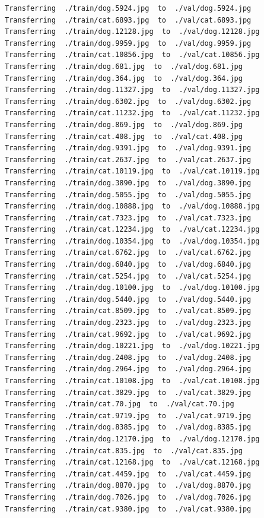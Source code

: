 \documentclass[]{book}
\theoremstyle{definition}
\theoremstyle{definition}
\theoremstyle{definition}
\theoremstyle{remark}
\begin{document}
\begin{verbatim}
Transferring  ./train/dog.5924.jpg  to  ./val/dog.5924.jpg
Transferring  ./train/cat.6893.jpg  to  ./val/cat.6893.jpg
Transferring  ./train/dog.12128.jpg  to  ./val/dog.12128.jpg
Transferring  ./train/dog.9959.jpg  to  ./val/dog.9959.jpg
Transferring  ./train/cat.10856.jpg  to  ./val/cat.10856.jpg
Transferring  ./train/dog.681.jpg  to  ./val/dog.681.jpg
Transferring  ./train/dog.364.jpg  to  ./val/dog.364.jpg
Transferring  ./train/dog.11327.jpg  to  ./val/dog.11327.jpg
Transferring  ./train/dog.6302.jpg  to  ./val/dog.6302.jpg
Transferring  ./train/cat.11232.jpg  to  ./val/cat.11232.jpg
Transferring  ./train/dog.869.jpg  to  ./val/dog.869.jpg
Transferring  ./train/cat.408.jpg  to  ./val/cat.408.jpg
Transferring  ./train/dog.9391.jpg  to  ./val/dog.9391.jpg
Transferring  ./train/cat.2637.jpg  to  ./val/cat.2637.jpg
Transferring  ./train/cat.10119.jpg  to  ./val/cat.10119.jpg
Transferring  ./train/dog.3890.jpg  to  ./val/dog.3890.jpg
Transferring  ./train/dog.5055.jpg  to  ./val/dog.5055.jpg
Transferring  ./train/dog.10888.jpg  to  ./val/dog.10888.jpg
Transferring  ./train/cat.7323.jpg  to  ./val/cat.7323.jpg
Transferring  ./train/cat.12234.jpg  to  ./val/cat.12234.jpg
Transferring  ./train/dog.10354.jpg  to  ./val/dog.10354.jpg
Transferring  ./train/cat.6762.jpg  to  ./val/cat.6762.jpg
Transferring  ./train/dog.6840.jpg  to  ./val/dog.6840.jpg
Transferring  ./train/cat.5254.jpg  to  ./val/cat.5254.jpg
Transferring  ./train/dog.10100.jpg  to  ./val/dog.10100.jpg
Transferring  ./train/dog.5440.jpg  to  ./val/dog.5440.jpg
Transferring  ./train/cat.8509.jpg  to  ./val/cat.8509.jpg
Transferring  ./train/dog.2323.jpg  to  ./val/dog.2323.jpg
Transferring  ./train/cat.9692.jpg  to  ./val/cat.9692.jpg
Transferring  ./train/dog.10221.jpg  to  ./val/dog.10221.jpg
Transferring  ./train/dog.2408.jpg  to  ./val/dog.2408.jpg
Transferring  ./train/dog.2964.jpg  to  ./val/dog.2964.jpg
Transferring  ./train/cat.10108.jpg  to  ./val/cat.10108.jpg
Transferring  ./train/cat.3829.jpg  to  ./val/cat.3829.jpg
Transferring  ./train/cat.70.jpg  to  ./val/cat.70.jpg
Transferring  ./train/cat.9719.jpg  to  ./val/cat.9719.jpg
Transferring  ./train/dog.8385.jpg  to  ./val/dog.8385.jpg
Transferring  ./train/dog.12170.jpg  to  ./val/dog.12170.jpg
Transferring  ./train/cat.835.jpg  to  ./val/cat.835.jpg
Transferring  ./train/cat.12168.jpg  to  ./val/cat.12168.jpg
Transferring  ./train/cat.4459.jpg  to  ./val/cat.4459.jpg
Transferring  ./train/dog.8870.jpg  to  ./val/dog.8870.jpg
Transferring  ./train/dog.7026.jpg  to  ./val/dog.7026.jpg
Transferring  ./train/cat.9380.jpg  to  ./val/cat.9380.jpg

\end{verbatim}
\end{document}
